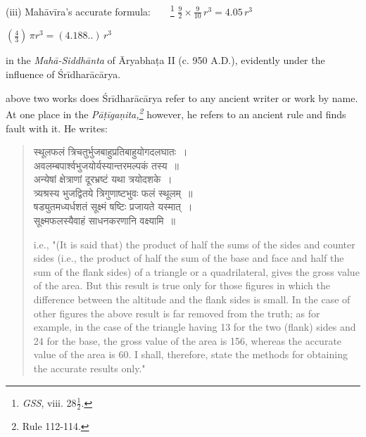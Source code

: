 \documentclass[10pt, openany]{book}
\begin{document}
\hspace{0.9cm}(iii) Mahāvīra's accurate formula:~~~~\renewcommand{\thefootnote}{\hspace{-4.5mm} 6}\footnote{\hspace{-2mm} \englishfont \textit{GSS}, viii. 28$\frac{1}{2}$.} $\frac{9}{2}\times{\frac{9}{10}}\,{r^3} = 4.05\,{r^3}$

\vspace{0.3cm}{Śrīdharācārya's \,formula \,is \,the \,best, \,as \,it \,more \,closely \,approximates \,to \,the modern formula:}
\vspace{1mm}

\hspace{2cm}$(\frac{4}{3})\,\pi {r^3} = (4.188..)\,{r^3}$

\newpage

{in the \textit{Mahā-Siddhānta} of Āryabhaṭa II (c. 950 A.D.),}
{evidently under the influence of Śrīdharācārya.}

{above two works does Śrīdharācārya refer to any ancient}
{writer or work by name. At one place in the \textit{Pāṭīgaṇita,\renewcommand{\thefootnote}{1}\footnote{\hspace{-2mm} Rule 112-114.}}}
{however, he refers to an ancient rule and finds fault with it.}
{He writes:}

\begin{quote}
{\qt स्थूलफलं त्रिचतुर्भुजबाहुप्रतिबाहुयोगदलघातः~।\\
 अवलम्बपार्श्वभुजयोर्यस्यान्तरमल्पकं तस्य~॥\\
 अन्येषां क्षेत्राणां दूरभ्रष्टं यथा त्रयोदशके~।\\
 त्र्यश्रस्य भुजद्वितये त्रिगुणाष्टभुवः फलं स्थूलम्~॥\\
 षड्युतमध्यर्धशतं सूक्ष्मं षष्टिः प्रजायते यस्मात्~।\\
 सूक्ष्मफलस्यैवाहं साधनकरणानि वक्ष्यामि~॥}
 
\englishfont i.e., {\eqt "(It is said that) the product of half the sums of the
{sides and counter sides (i.e., the product of half the sum}
{of the base and face and half the sum of the flank sides)}
{of a triangle or a quadrilateral, gives the gross value of}
{the area. But this result is true only for those figures in}
{which the difference between the altitude and the flank}
{sides is small. In the case of other figures the above}
{result is far removed from the truth; as for example, in}
{the case of the triangle having 13 for the two (flank) sides}
{and 24 for the base, the gross value of the area is 156,}
{whereas the accurate value of the area is 60. I shall,}
{therefore, state the methods for obtaining the accurate}
{results only."}}
\end{quote}
\end{document}
